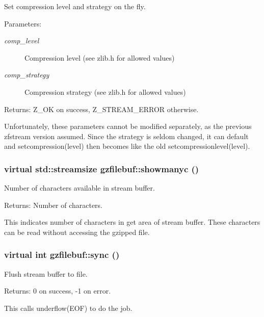 Set compression level and strategy on the fly. 

\begin{Desc}
\item[Parameters:]
\begin{description}
\item[{\em comp\_\-level}]Compression level (see zlib.h for allowed values) \item[{\em comp\_\-strategy}]Compression strategy (see zlib.h for allowed values) \end{description}
\end{Desc}
\begin{Desc}
\item[Returns:]Z\_\-OK on success, Z\_\-STREAM\_\-ERROR otherwise.\end{Desc}
Unfortunately, these parameters cannot be modified separately, as the previous zfstream version assumed. Since the strategy is seldom changed, it can default and setcompression(level) then becomes like the old setcompressionlevel(level). 
\subsubsection{\setlength{\rightskip}{0pt plus 5cm}virtual std::streamsize gzfilebuf::showmanyc ()\hspace{0.3cm}{\tt  [protected, virtual]}}\label{classgzfilebuf_297ec6d2cb06ae35ae57b2df48862f67}


Number of characters available in stream buffer. 

\begin{Desc}
\item[Returns:]Number of characters.\end{Desc}
This indicates number of characters in get area of stream buffer. These characters can be read without accessing the gzipped file. 
\subsubsection{\setlength{\rightskip}{0pt plus 5cm}virtual int gzfilebuf::sync ()\hspace{0.3cm}{\tt  [protected, virtual]}}\label{classgzfilebuf_170bf1bb08797eb922301d6b90fa95e4}


Flush stream buffer to file. 

\begin{Desc}
\item[Returns:]0 on success, -1 on error.\end{Desc}
This calls underflow(EOF) to do the job. 
